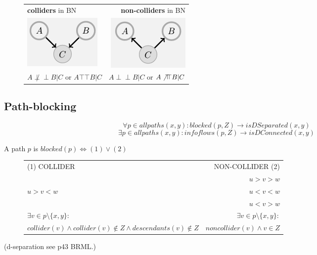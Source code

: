 \documentclass[a4paper,10pt]{article}
\newcommand{\negspace}{\!\!\!}
\newcommand{\idp}{\perp \negspace \perp}
\newcommand{\nidp}{\not \idp}
\newcommand{\dep}{\top \negspace \top}
\newcommand{\ndep}{\not \dep}
\begin{document}
\begin{figure}[htb!]
\begin{tabular}{l||r}
\textbf{colliders} in BN & \textbf{non-colliders} in BN \\
\includegraphics{gcollider.png} & \includegraphics{gnocol.png}  \\
 \large $ A \nidp B | C$ or $ A \dep B | C$ & \large $ A \idp B | C$ or $ A \ndep B | C$ \\
\end{tabular}
\centering
\end{figure}

\subsection{Path-blocking} 
$$\forall p \in allpaths(x,y): blocked(p,Z) \rightarrow isDSeparated(x,y) $$
$$\exists p \in allpaths(x,y): infoflows(p,Z) \rightarrow isDConnected(x,y) $$

A path $p$ is $blocked(p) \iff (1) \vee (2)$
\begin{figure}[htb!]
\begin{tabular}{l||r}
 (1) COLLIDER  & NON-COLLIDER (2) \\
   & $u>v>w$ \\
  $u>v<w$  & $u<v<w$ \\
   & $u<v>w$ \\
$\exists v \in p \setminus \{x,y\} :$ &  $\exists v \in p \setminus \{x,y\} :$ \\
$collider(v) \wedge collider(v) \notin Z \wedge descendants(v) \notin Z$  &  $noncollider(v) \wedge v \in Z$
\end{tabular}
\centering
\end{figure}
(d-separation see p43 BRML.)
\end{document}

